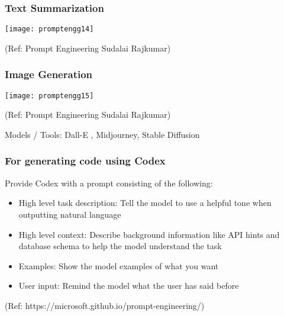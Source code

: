 \begin{frame}[fragile]\frametitle{Text Summarization}

\begin{center}
\texttt{[image: promptengg14]}

{\tiny (Ref: Prompt Engineering Sudalai Rajkumar)}

\end{center}		
		


\end{frame}

\begin{frame}[fragile]\frametitle{Image Generation}

\begin{center}
\texttt{[image: promptengg15]}

{\tiny (Ref: Prompt Engineering Sudalai Rajkumar)}

\end{center}		
		
		
Models / Tools: Dall-E , Midjourney, Stable Diffusion



\end{frame}


\begin{frame}[fragile]\frametitle{For generating code using Codex}

Provide Codex with a prompt consisting of the following:



\begin{itemize}
\item  High level task description: Tell the model to use a helpful tone when outputting natural language
\item  High level context: Describe background information like API hints and database schema to help the model understand the task
\item  Examples: Show the model examples of what you want
\item  User input: Remind the model what the user has said before
\end{itemize}	 

{\tiny (Ref: https://microsoft.github.io/prompt-engineering/)}

\end{frame}


